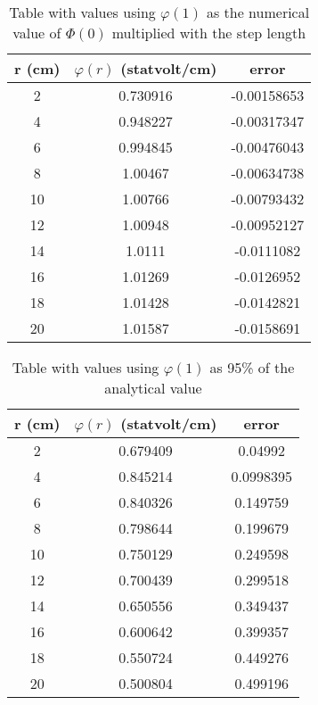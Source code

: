 \documentclass[11pt]{article}
\begin{document}
\begin{table}[h]
\center
\caption{Table with values using $\varphi(1)$ as the numerical value of $\Phi(0)$ multiplied with the step length}
\begin{tabular}{c|c|c}
r (cm) & $\varphi(r)$ (statvolt/cm) & error \\ \hline
2 & 0.730916 & -0.00158653 \\ \hline 
4 & 0.948227 & -0.00317347 \\ \hline 
6 & 0.994845 & -0.00476043 \\ \hline 
8 & 1.00467 & -0.00634738 \\ \hline 
10 & 1.00766 & -0.00793432 \\ \hline 
12 & 1.00948 & -0.00952127 \\ \hline 
14 & 1.0111 & -0.0111082 \\ \hline 
16 & 1.01269 & -0.0126952 \\ \hline 
18 & 1.01428 & -0.0142821 \\ \hline 
20 & 1.01587 & -0.0158691 \\ 
\end{tabular}
\end{table}

\begin{table}[h]
\center
\caption{Table with values using $\varphi(1)$ as 95\% of the analytical value}
\begin{tabular}{c|c|c}
r (cm) & $\varphi(r)$ (statvolt/cm) & error \\ \hline
2 & 0.679409 & 0.04992 \\ \hline 
4 & 0.845214 & 0.0998395 \\ \hline 
6 & 0.840326 & 0.149759 \\ \hline 
8 & 0.798644 & 0.199679 \\ \hline 
10 & 0.750129 & 0.249598 \\ \hline 
12 & 0.700439 & 0.299518 \\ \hline 
14 & 0.650556 & 0.349437 \\ \hline 
16 & 0.600642 & 0.399357 \\ \hline 
18 & 0.550724 & 0.449276 \\ \hline 
20 & 0.500804 & 0.499196 \\
\end{tabular}
\end{table}

\newpage
\end{document}
